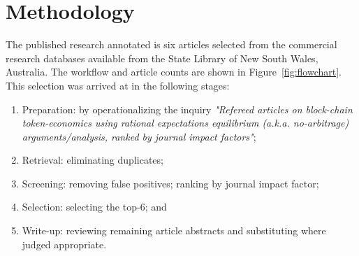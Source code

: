 \documentclass[11pt]{article}
\begin{document}
\appendix

\section{Methodology}
The published research annotated is six articles selected from the commercial research databases available from the State Library of New South Wales, Australia. The workflow and article counts are shown in Figure~\ref{fig:flowchart}.  This selection was arrived at in the following stages:
\begin{enumerate}
    \item Preparation:
    by operationalizing the inquiry \textit{"Refereed articles on block-chain token-economics using rational expectations equilibrium (a.k.a. no-arbitrage) arguments/analysis, ranked by journal impact factors"};
    \item Retrieval:
    eliminating duplicates;
    \item Screening:
    removing false positives;
    ranking by journal impact factor;
    \item Selection:
    selecting the top-6; and
    \item Write-up:
    reviewing remaining article abstracts and substituting where judged appropriate.
\end{enumerate}
\end{document}
